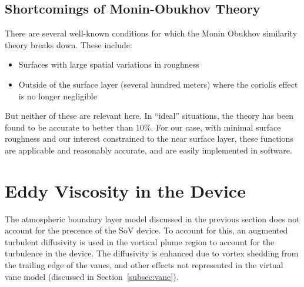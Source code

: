 \subsection{Shortcomings of Monin-Obukhov Theory}

There are several well-known conditions for which the Monin
Obukhov similarity theory breaks down. These include:
 
\begin{itemize}
 \item Surfaces with large spatial variations in roughness
 \item Outside of the surface layer (several hundred meters) where the 
       coriolis effect is no longer negligible
\end{itemize}

But neither of these are relevant here. 
In ``ideal'' situations, the theory has been found to be
accurate to better than 10\%\cite{QJ:QJ49709741204,kaimal}. 
For our case, with minimal surface roughness and our interest
constrained to the near surface layer, these functions are applicable
and reasonably accurate\cite{Foken2006}, and are easily implemented in
software.  

\section{Eddy Viscosity in the Device}

The atmospheric boundary layer model discussed in the previous section
does not account for the precence of the SoV device.
To account for this, an augmented turbulent diffusivity 
is used in the vortical plume region to account for the turbulence 
in the device. The diffusivity is enhanced due to vortex shedding from the 
trailing edge of the vanes, and other effects not 
represented in the virtual vane model (discussed in Section~\ref{subsec:vane}). 


